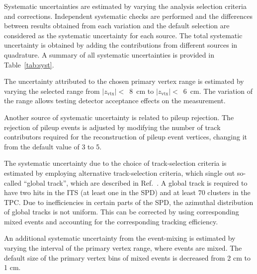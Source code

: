 Systematic uncertainties are estimated by varying the analysis selection criteria and corrections. Independent systematic checks are performed and the differences between results obtained from each variation and the default selection are considered as the systematic uncertainty for each source. The total systematic uncertainty is obtained by adding the contributions from different sources in quadrature. A summary of all systematic uncertainties is provided in Table~\ref{tab:syst}. 

The uncertainty attributed to the chosen primary vertex range is estimated by varying the selected range from $|z_\mathrm{vtx}|<$~8~cm to $|z_\mathrm{vtx}|<$~6~cm. The variation of the range allows testing detector acceptance effects on the measurement.  

Another source of systematic uncertainty is related to pileup rejection. The rejection of pileup events is adjusted by modifying the number of track contributors required for the reconstruction of pileup event vertices, changing it from the default value of 3 to 5.

The systematic uncertainty due to the choice of track-selection criteria is estimated by employing alternative track-selection criteria, which single out so-called “global track”, which are described in Ref.~\cite{ALICE:2021ptz}. A global track is required to have two hits in the ITS (at least one in the SPD) and at least 70 clusters in the TPC. Due to inefficiencies in certain parts of the SPD, the azimuthal distribution of global tracks is not uniform. This can be corrected by using corresponding mixed events and accounting for the corresponding tracking efficiency.


An additional systematic uncertainty from the event-mixing is estimated by varying the interval of the primary vertex range, where events are mixed. The default size of the primary vertex bins of mixed events is decreased from 2 cm to 1 cm. 

